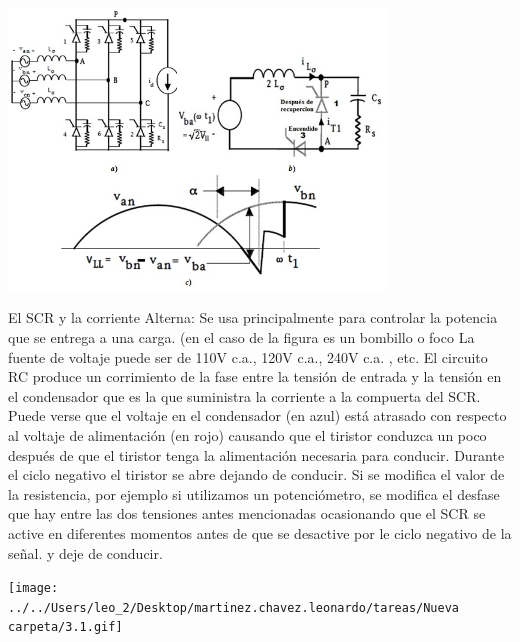 \documentclass[12pt,a4paper]{article}
\begin{document}
\begin{center}
\includegraphics[width=10cm]{2.jpg} 
\end{center}
\begin{flushleft}
El SCR y la corriente Alterna:
Se usa principalmente para controlar la potencia que se entrega a una carga. (en el caso de la figura es un bombillo o foco
La fuente de voltaje puede ser de 110V c.a., 120V c.a., 240V c.a. , etc.
El circuito RC produce un corrimiento de la fase entre la tensión de entrada y la tensión en el condensador que es la que suministra la corriente a la compuerta del SCR. Puede verse que el voltaje en el condensador (en azul) está atrasado con respecto al voltaje de alimentación (en rojo) causando que el tiristor conduzca un poco después de que el tiristor tenga la alimentación necesaria para conducir.
Durante el ciclo negativo el tiristor se abre dejando de conducir. Si se modifica el valor de la resistencia, por ejemplo si utilizamos un potenciómetro, se modifica el desfase que hay entre las dos tensiones antes mencionadas ocasionando que el SCR se active en diferentes momentos antes de que se desactive por le ciclo negativo de la señal. y deje de conducir.

\end{flushleft}
\begin{center}
\texttt{[image: ../../Users/leo\_2/Desktop/martinez.chavez.leonardo/tareas/Nueva carpeta/3.1.gif]} 
\end{center}
\end{document}
